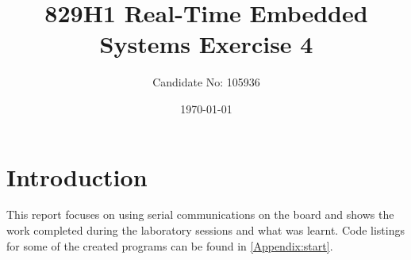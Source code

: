 \documentclass[a4paper,12pt]{scrartcl}
\title{829H1 Real-Time Embedded Systems Exercise 4}
\author{Candidate No: 105936}
\date{\today}
\begin{document}
	
	\begin{titlepage}
		\maketitle
	\end{titlepage}
	
	\tableofcontents
	\newpage
	
	\section{Introduction}
	{
		This report focuses on using serial communications on the board and shows the work completed during the laboratory sessions and what was learnt. Code listings for some of the created programs can be found in \cref{Appendix:start}.
	}
	
\end{document}
